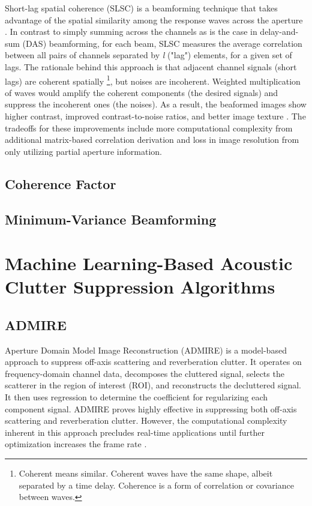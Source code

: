 Short-lag spatial coherence (SLSC) is a beamforming technique that takes advantage of the spatial similarity among the response waves across the aperture \cite{slsc}. In contrast to simply summing across the channels as is the case in delay-and-sum (DAS) beamforming, for each beam, SLSC measures the average correlation between all pairs of channels separated by \textit{l} ("lag") elements, for a given set of lags. The rationale behind this approach is that adjacent channel signals (short lags) are coherent spatially \footnote{Coherent means similar. Coherent waves have the same shape, albeit separated by a time delay. Coherence is a form of correlation or covariance between waves.}, but noises are incoherent. Weighted multiplication of waves would amplify the coherent components (the desired signals) and suppress the incoherent ones (the noises). As a result, the beaformed images show higher contrast, improved contrast-to-noise ratios, and better image texture \cite{dahl2017coherence}. The tradeoffs for these improvements include more computational complexity from additional matrix-based correlation derivation and loss in image resolution from only utilizing partial aperture information\cite{lediju2015resolution}.


\subsection{Coherence Factor}


\subsection{Minimum-Variance Beamforming}


\section{Machine Learning-Based Acoustic Clutter Suppression Algorithms}

\subsection{ADMIRE}

Aperture Domain Model Image Reconstruction (ADMIRE) is a model-based approach to suppress off-axis scattering and reverberation clutter. It operates on frequency-domain channel data, decomposes the cluttered signal, selects the scatterer in the region of interest (ROI), and reconstructs the decluttered signal. It then uses regression to determine the coefficient for regularizing each component signal. ADMIRE proves highly effective in suppressing both off-axis scattering and reverberation clutter. However, the computational complexity inherent in this approach precludes real-time applications until further optimization increases the frame rate \cite{dei_2019, admire2015}.

